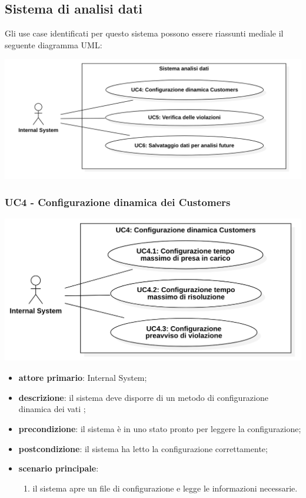 \subsection{Sistema di analisi dati}
Gli use case identificati per questo sistema possono essere riassunti mediale il seguente diagramma UML:
\begin{center}
	\includegraphics[keepaspectratio = true, width=15cm]{immagini/uc/3.png}
\end{center}
\subsubsection{UC4 - Configurazione dinamica dei Customers}
\begin{center}
	\includegraphics[keepaspectratio = true, width=15cm]{immagini/uc/4.png}
\end{center}
\begin{itemize}
	\item \textbf{attore primario}: Internal System;
	\item \textbf{descrizione}: il sistema deve disporre di un metodo di configurazione dinamica dei vati  ;
	\item \textbf{precondizione}: il sistema è in uno stato pronto per leggere la configurazione;
	\item \textbf{postcondizione}: il sistema ha letto la configurazione correttamente;
	\item \textbf{scenario principale}: 
	\begin{enumerate}
		\item il sistema apre un file di configurazione e legge le informazioni necessarie.
	\end{enumerate}
\end{itemize}
